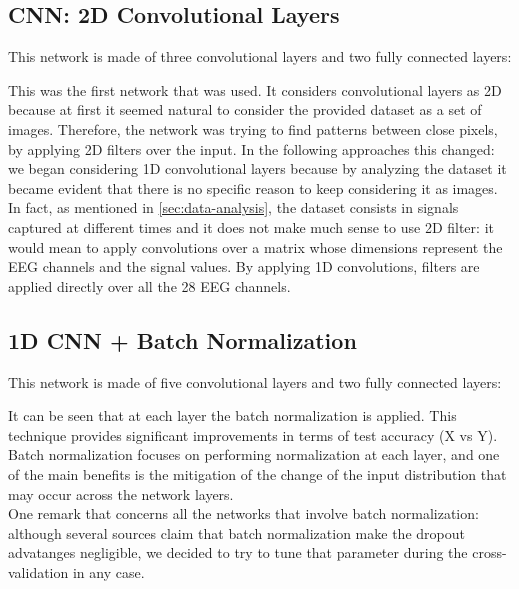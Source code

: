 \documentclass[10pt,conference,compsocconf]{IEEEtran}
\begin{document}
\subsection{CNN: 2D Convolutional Layers}
This network is made of three convolutional layers and two fully connected layers:

This was the first network that was used. It considers convolutional layers as 2D because at first it seemed natural to consider the provided dataset as a set of images. Therefore, the network was trying to find patterns between close pixels, by applying 2D filters over the input. In the following approaches this changed: we began considering 1D convolutional layers because by analyzing the dataset it became evident that there is no specific reason to keep considering it as images. In fact, as mentioned in \ref{sec:data-analysis}, the dataset consists in signals captured at different times and it does not make much sense to use 2D filter: it would mean to apply convolutions over a matrix whose dimensions represent the EEG channels and the signal values. By applying 1D convolutions, filters are applied directly over all the 28 EEG channels.
\subsection{1D CNN + Batch Normalization}
This network is made of five convolutional layers and two fully connected layers:

It can be seen that at each layer the batch normalization is applied. This technique provides significant improvements in terms of test accuracy (X vs Y). Batch normalization focuses on performing normalization at each layer, and one of the main benefits is the mitigation of the change of the input distribution that may occur across the network layers. \\%
One remark that concerns all the networks that involve batch normalization: although several sources claim that batch normalization make the dropout advatanges negligible, we decided to try to tune that parameter during the cross-validation in any case.
\end{document}
